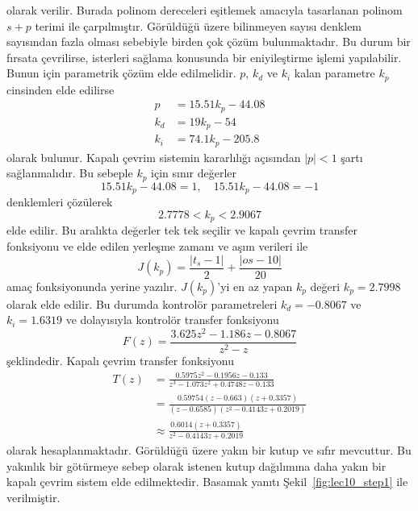 olarak verilir. Burada polinom dereceleri eşitlemek amacıyla tasarlanan polinom $s+p$ terimi ile çarpılmıştır. Görüldüğü üzere bilinmeyen sayısı denklem sayısından fazla olması sebebiyle birden çok çözüm bulunmaktadır. Bu durum bir fırsata çevrilirse, isterleri sağlama konusunda bir eniyileştirme işlemi yapılabilir. Bunun için parametrik çözüm elde edilmelidir. $p$, $k_d$ ve $k_i$ kalan parametre $k_p$ cinsinden elde edilirse 
\begin{equation}
    \begin{split}
        p&=15.51k_p-44.08\\
        k_d&=19k_p-54\\
        k_i&=74.1k_p-205.8
    \end{split}
\end{equation}
olarak bulunur. Kapalı çevrim sistemin kararlılığı açısından $|p|<1$ şartı sağlanmalıdır. Bu sebeple $k_p$ için sınır değerler
\begin{equation}
    15.51k_p-44.08=1,\quad 15.51k_p-44.08=-1
\end{equation}
denklemleri çözülerek 
\begin{equation}
    2.7778<k_p<2.9067
\end{equation}
elde edilir. Bu aralıkta değerler tek tek seçilir ve kapalı çevrim transfer fonksiyonu ve elde edilen yerleşme zamanı ve aşım verileri ile 
\begin{equation}
    J(k_p)=\frac{|t_s-1|}{2}+\frac{|os-10|}{20}
\end{equation}
amaç fonksiyonunda yerine yazılır. $J(k_p)$'yi en az yapan $k_p$ değeri $k_p=2.7998$ olarak elde edilir. Bu durumda kontrolör parametreleri $k_d=-0.8067$ ve $k_i=1.6319$ ve dolayısıyla kontrolör transfer fonksiyonu
\begin{equation}
    F(z)=\frac{3.625 z^2 - 1.186 z - 0.8067}{ z^2 - z}
\end{equation}
şeklindedir. Kapalı çevrim transfer fonksiyonu 
\begin{equation}
\begin{split}
    T(z)&=\frac{0.5975 z^2 - 0.1956 z - 0.133}{z^3 - 1.073 z^2 + 0.4748 z - 0.133}\\
    &=\frac{0.59754 (z-0.663) (z+0.3357)}{(z-0.6585) (z^2 - 0.4143z + 0.2019)}\\
    &\approx\frac{0.6014(z+0.3357)}{z^2 - 0.4143z + 0.2019}
\end{split}
\end{equation}
olarak hesaplanmaktadır. Görüldüğü üzere yakın bir kutup ve sıfır mevcuttur. Bu yakınlık bir götürmeye sebep olarak istenen kutup dağılımına daha yakın bir kapalı çevrim sistem elde edilmektedir. Basamak yanıtı Şekil~\ref{fig:lec10_step1} ile verilmiştir.

